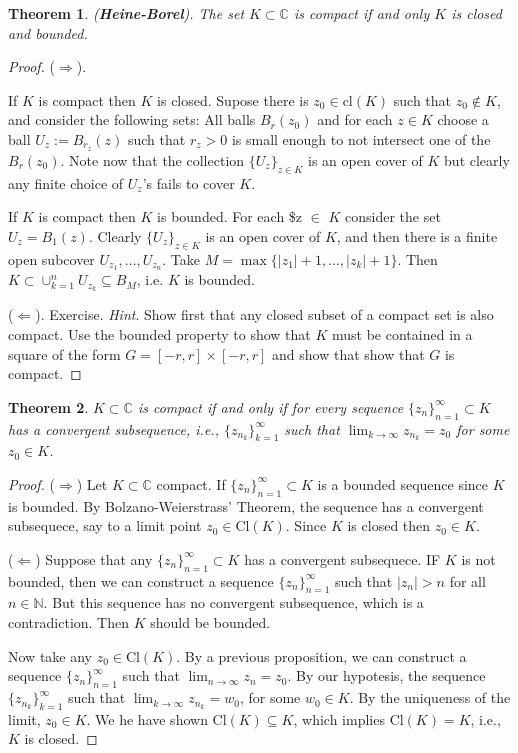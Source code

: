 \documentclass{amsart}
\newtheorem{thm}{Theorem}
\begin{document}
\begin{thm}
(\textbf{Heine-Borel}). The set \(K\subset \mathbb{C}\) is compact if and only \(K\) is closed and bounded.
\end{thm}
\begin{proof}


(\(\Rightarrow\)).

If \(K\) is compact then \(K\) is closed. Supose there is \(z_0\in \mbox{cl}(K)\) such that \(z_0\notin K\), and consider the following sets: All balls \(B_r(z_0)\) and for each \(z\in K\) choose a ball \(U_z:=B_{r_z}(z)\) such that \(r_z>0\) is small enough to not intersect one of the \(B_r(z_0)\). Note now that the collection \(\{U_z \}_{z\in K}\) is an open cover of \(K\) but clearly any finite choice of \(U_z\)'s fails to cover \(K\).

If \(K\) is compact then \(K\) is bounded. For each \$z \(\in\) \(K\) consider the set \(U_{z} = B_{1}(z)\). Clearly \(\{U_z \}_{z\in K}\) is an open cover of \(K\), and then there is a finite open subcover \(U_{z_1}, \ldots, U_{z_n}\). Take \(M = \max\{|z_1| + 1, \ldots, |z_k| +1 \}\). Then \(K \subset \cup_{k=1}^{n} U_{z_k} \subseteq B_M\), i.e. \(K\) is bounded.

(\(\Leftarrow\)). Exercise.
\emph{Hint}. Show first that any closed subset of a compact set is also compact. Use the bounded property to show that \(K\) must be contained in a square of the form \(G= [-r,r]\times [-r,r]\) and show that show that \(G\) is compact.
\end{proof}

\begin{thm}
\(K\subset \mathbb{C}\) is compact if and only if for every sequence \(\{z_n\}_{n=1}^{\infty}\subset K\) has a convergent subsequence, i.e., \(\{z_{n_k}\}_{k=1}^{\infty}\) such that \(\lim_{k\to\infty} z_{n_k} = z_0\) for some \(z_0\in K\).
\end{thm}
\begin{proof}
(\(\Rightarrow\)) Let \(K\subset\mathbb{C}\) compact. If \(\{z_n\}_{n=1}^{\infty}\subset K\) is a bounded sequence since \(K\) is bounded. By Bolzano-Weierstrass' Theorem, the sequence has a convergent subsequece, say to a limit point \(z_0\in \mbox{Cl}(K)\). Since \(K\) is closed then \(z_0\in K\).


(\(\Leftarrow\)) Suppose that any  \(\{z_n\}_{n=1}^{\infty}\subset K\)  has a convergent subsequece. IF \(K\) is not bounded, then we can construct a sequence \(\{z_n\}_{n=1}^{\infty}\) such that \(|z_n| > n\) for all \(n\in \mathbb{N}\). But this sequence has no convergent subsequence, which is a contradiction. Then \(K\) should be bounded.

Now take any \(z_0\in \mbox{Cl}(K)\). By a previous proposition, we can construct a sequence  \(\{z_{n}\}_{n=1}^{\infty}\) such that \(\lim_{n\to\infty} z_n = z_0\). By our hypotesis, the sequence \(\{z_{n_k}\}_{k=1}^{\infty}\) such that \(\lim_{k\to\infty} z_{n_k} = w_0\), for some \(w_0\in K\). By the uniqueness of the limit, \(z_0 \in K\). We he have shown \(\mbox{Cl}(K) \subseteq K\), which implies \(\mbox{Cl}(K) = K\), i.e., \(K\) is closed.
\end{proof}
\end{document}
